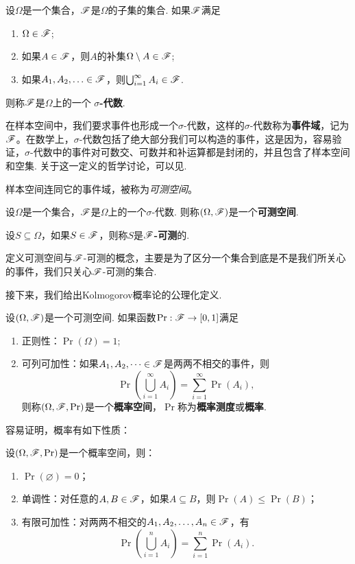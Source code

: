 \begin{definition}[$\sigma$-代数]
设$\Omega$是一个集合，$\mathscr{F}$是$\Omega$的子集的集合. 如果$\mathscr{F}$满足
\begin{enumerate}
    \item $\Omega\in\mathscr{F}$;
    \item 如果$A\in\mathscr{F}$，则$A$的补集$\Omega\setminus A\in\mathscr{F}$;
    \item 如果$A_1,A_2,\ldots\in\mathscr{F}$，则$\bigcup_{i=1}^\infty A_i\in\mathscr{F}$.
\end{enumerate}
则称$\mathscr{F}$是$\Omega$上的一个 \textbf{$\sigma$-代数}. 
\end{definition}


在样本空间中，我们要求事件也形成一个$\sigma$-代数，这样的$\sigma$-代数称为\textbf{事件域}，记为$\mathscr{F}$。在数学上，$\sigma$-代数包括了绝大部分我们可以构造的事件，这是因为，容易验证，$\sigma$-代数中的事件对可数交、可数并和补运算都是封闭的，并且包含了样本空间和空集. 关于这一定义的哲学讨论，可以见.  

样本空间连同它的事件域，被称为\emph{可测空间}。

\begin{definition}[可测空间] 
设$\Omega$是一个集合，$\mathscr{F}$是$\Omega$上的一个$\sigma$-代数. 则称$(\Omega,\mathscr{F})$是一个\textbf{可测空间}.

设$S\subseteq\Omega$，如果$S\in\mathscr{F}$，则称$S$是\textbf{$\mathscr{F}$-可测}的.
\end{definition}

定义可测空间与$\mathscr{F}$-可测的概念，主要是为了区分一个集合到底是不是我们所关心的事件，我们只关心$\mathscr{F}$-可测的集合.

接下来，我们给出Kolmogorov概率论的公理化定义. 

\begin{definition}
设$(\Omega,\mathscr{F})$是一个可测空间. 如果函数$\Pr:\mathscr{F}\to[0,1]$满足
\begin{enumerate}
    \item 正则性：$\Pr(\Omega)=1$;
    \item 可列可加性：如果$A_1,A_2,\dots\in\mathscr{F}$是两两不相交的事件，则
    \[
        \Pr\left(\bigcup_{i=1}^\infty A_i\right) = \sum_{i=1}^\infty \Pr(A_i),
    \]
    则称$(\Omega,\mathscr{F},\Pr)$是一个\textbf{概率空间}，$\Pr$称为\textbf{概率测度}或\textbf{概率}. 
\end{enumerate}
\end{definition}

容易证明，概率有如下性质：
\begin{proposition}
设$(\Omega,\mathscr{F},\Pr)$是一个概率空间，则：
\begin{enumerate}
    \item $\Pr(\varnothing)=0$；
    \item 单调性：对任意的$A,B\in\mathscr{F}$，如果$A\subseteq B$，则$\Pr(A)\leq\Pr(B)$；
    \item 有限可加性：对两两不相交的$A_1,A_2,\dots,A_n\in\mathscr{F}$，有
    \[
        \Pr\left(\bigcup_{i=1}^n A_i\right) = \sum_{i=1}^n \Pr(A_i).
    \]
\end{enumerate}
\end{proposition}


